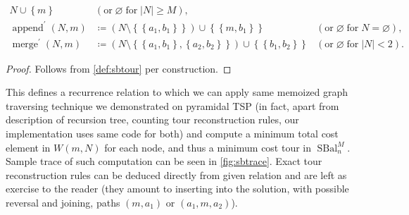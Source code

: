 \documentclass[index=totoc,bibliography=totoc]{scrartcl}
\newcommand{\annotation}[1]{\marginpar{\small\itshape\color{green}#1}}
\numberwithin{equation}{section}
\numberwithin{figure}{section}
\numberwithin{table}{section}
\begin{document}
\begin{proposition}
\[\begin{alignedat}{2}
    N \cup \left\{m\right\}
    & (\text{or}\; \varnothing \;\text{for}\; \left|N\right| \geq M),
    \\
    \operatorname{append}^\prime\left(N,m\right) & \coloneqq
    \left(N \setminus \left\{\left\{a_1,b_1\right\}\right\}\right) \cup \left\{\left\{m,b_1\right\}\right\}
    & (\text{or}\; \varnothing \;\text{for}\; N = \varnothing),
    \\
    \operatorname{merge}^\prime\left(N,m\right) & \coloneqq
    \left(N \setminus \left\{\left\{a_1,b_1\right\},\left\{a_2,b_2\right\}\right\}\right)
      \cup \left\{\left\{b_1,b_2\right\}\right\}
    & (\text{or}\; \varnothing \;\text{for}\; \left|N\right| < 2).
  \end{alignedat}
  \]
\end{proposition}
\begin{proof}
  Follows from \cref{def:sbtour} per construction.
\end{proof}

This defines a recurrence relation to which we can apply same memoized
graph traversing technique we demonstrated on pyramidal TSP (in fact,
apart from description of recursion tree, counting tour reconstruction
rules, our implementation uses same code for both) and compute a minimum
total cost element in $W\left(m,N\right)$ for each node, and thus a minimum
cost tour in $\operatorname{SBal}_n^M$.  Sample trace of such computation
can be seen in \cref{fig:sbtrace}.  Exact tour reconstruction rules can be
deduced directly from given relation and are left as exercise to the reader
(they amount to inserting into the solution, with possible reversal and
joining, paths $(m,a_1)$ or $(a_1,m,a_2)$).

\setlength{\aboverulesep}{0pt}
\setlength{\belowrulesep}{0pt}
\renewcommand{\tabcolsep}{9pt}
\setlength{\extrarowheight}{1.1ex}
\end{document}
